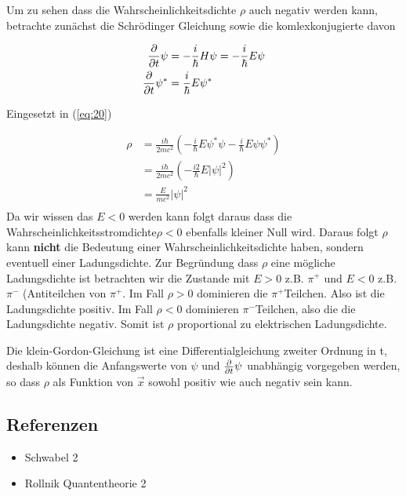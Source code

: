 Um zu sehen dass die Wahrscheinlichkeitsdichte \(\rho\) auch negativ werden kann, betrachte zunächst die Schrödinger Gleichung sowie die komlexkonjugierte davon

\begin{align}
  \label{eq:22}
  \pdiff_t \psi &= - \frac{i}{\hbar} H\psi = -  \frac{i}{\hbar} E\psi\\
\pdiff_t \psi^* &= \frac{i}{\hbar} E\psi^*
\end{align}


Eingesetzt in (\ref{eq:20})

\begin{align}
  \label{eq:23}
   \rho &=  \frac{i\hbar}{2mc^2}\left( - \frac{i}{\hbar} E \psi^*\psi   -\frac{i}{\hbar} E  \psi\psi^*   \right) \\
&= \frac{i\hbar}{2mc^2}\left( - \frac{i2}{\hbar} E |\psi|^2   \right)  \\
&= \frac{E}{mc^2}|\psi|^2    \\
\end{align}
Da wir wissen das \(E<0\) werden kann folgt daraus dass die Wahrscheinlichkeitsstromdichte\(\rho<0\) ebenfalls kleiner Null wird. Daraus folgt \(\rho\) kann \textbf{nicht} die Bedeutung einer Wahrscheinlichkeitsdichte haben, sondern eventuell einer Ladungsdichte. Zur Begründung dass \(\rho\) eine mögliche Ladungsdichte ist betrachten wir die Zustande mit \(E>0\) z.B. \(\pi^+\) und \(E<0\) z.B. \(\pi^-\) (Antiteilchen von \(\pi^+\). Im Fall \(\rho>0\) dominieren die \(\pi^+\)Teilchen. Also ist die Ladungsdichte positiv. Im Fall \(\rho<0\) dominieren \(\pi^-\)Teilchen, also die die Ladungsdichte negativ. Somit ist \(\rho\) proportional zu elektrischen Ladungsdichte.

Die klein-Gordon-Gleichung ist eine Differentialgleichung zweiter Ordnung in t, deshalb können die Anfangswerte von \(\psi\) und \(\pdiff_t\psi\) unabhängig vorgegeben werden, so dass \(\rho\) als Funktion von \(\vec x\) sowohl positiv wie auch negativ sein kann. 




\subsection*{Referenzen}
\begin{itemize}
\item Schwabel 2
\item Rollnik Quantentheorie 2
\end{itemize}


